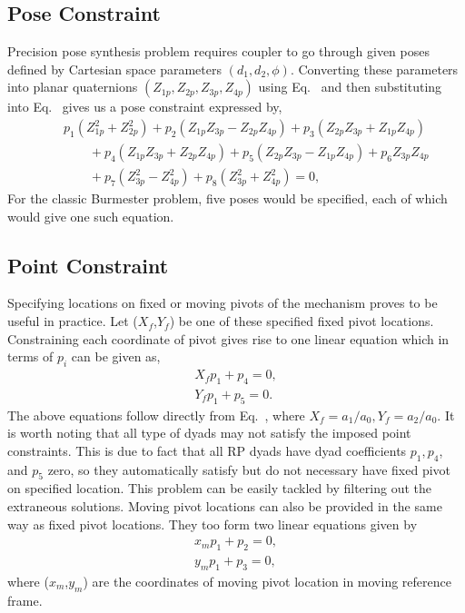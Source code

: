 \subsection{Pose Constraint}
Precision pose synthesis problem requires coupler to go through given poses defined by Cartesian space parameters $(d_1,d_2,\phi)$. Converting these parameters into planar  quaternions $(Z_{1p},Z_{2p},Z_{3p},Z_{4p})$ using Eq.~ and then substituting into Eq.~ gives us a pose constraint expressed by,
\begin{eqnarray}\label{poseConstraint}
& & p_1(Z_{1p}^2+Z_{2p}^2)+p_2(Z_{1p}Z_{3p}-Z_{2p}Z_{4p})+p_3(Z_{2p}Z_{3p}+Z_{1p}Z_{4p}) \nonumber \\
& & \ \ \ \ \ \ \ \ \  + p_4(Z_{1p}Z_{3p}+Z_{2p}Z_{4p}) +p_5(Z_{2p}Z_{3p}-Z_{1p}Z_{4p})+p_6Z_{3p}Z_{4p} \nonumber \\ & & \ \ \ \ \ \ \ \ \ +p_7(Z_{3p}^2-Z_{4p}^2)+p_{8}(Z_{3p}^2+Z_{4p}^2)=0,
\end{eqnarray}
For the classic Burmester problem, five poses would be specified, each of which would give one such equation.

\subsection{Point Constraint}
Specifying locations on fixed or moving pivots of the mechanism proves to be useful in practice. Let ($X_{f}$,$Y_{f}$) be one of these specified fixed pivot locations. Constraining each coordinate of pivot gives rise to one linear equation which in terms of $p_i$ can be given as,
\begin{equation}\label{fixedPointEq}
\begin{array}{l}
X_f p_1 + p_4 = 0,\\
Y_f p_1  + p_5 = 0.
\end{array}
\end{equation}
The above equations follow directly from Eq.~, where $X_f = a_1/a_0, Y_f = a_2/a_0$.
It is worth noting that all type of dyads may not satisfy the imposed point constraints. This is due to fact that all RP dyads have dyad coefficients $p_1, p_4$, and $p_5$ zero, so they automatically satisfy  but do not necessary have fixed pivot on specified location. This problem can be easily tackled by filtering out the extraneous solutions. Moving pivot locations can also be provided in the same way as fixed pivot locations. They too form two linear equations given by
\begin{equation}\label{movingPointEq}
\begin{array}{l}
x_m p_1 + p_2 = 0,\\
y_m p_1  + p_3 = 0,
\end{array}
\end{equation}
where ($x_m$,$y_m$) are the coordinates of moving pivot location in moving reference frame.
